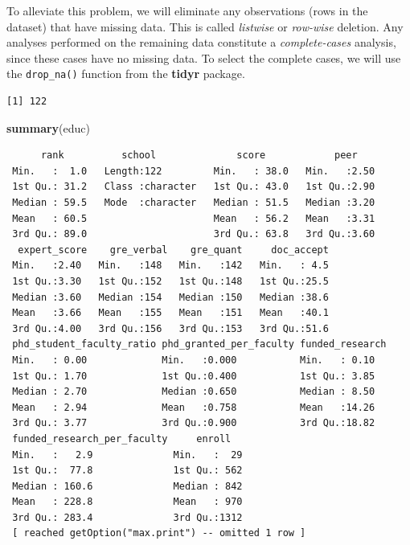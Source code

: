 \documentclass[]{book}
\newenvironment{Shaded}{\begin{snugshade}}{\end{snugshade}}
\newcommand{\CommentTok}[1]{\textcolor[rgb]{0.56,0.35,0.01}{\textit{#1}}}
\newcommand{\KeywordTok}[1]{\textcolor[rgb]{0.13,0.29,0.53}{\textbf{#1}}}
\newcommand{\NormalTok}[1]{#1}
\newcommand{\OperatorTok}[1]{\textcolor[rgb]{0.81,0.36,0.00}{\textbf{#1}}}
\newcommand{\StringTok}[1]{\textcolor[rgb]{0.31,0.60,0.02}{#1}}
\begin{document}
To alleviate this problem, we will eliminate any observations (rows in the dataset) that have missing data. This is called \emph{listwise} or \emph{row-wise} deletion. Any analyses performed on the remaining data constitute a \emph{complete-cases} analysis, since these cases have no missing data. To select the complete cases, we will use the \texttt{drop\_na()} function from the \textbf{tidyr} package.

\begin{Shaded}
\end{Shaded}

\begin{verbatim}
[1] 122
\end{verbatim}

\begin{Shaded}
\begin{Highlighting}[]
\KeywordTok{summary}\NormalTok{(educ)}
\end{Highlighting}
\end{Shaded}

\begin{verbatim}
      rank          school              score            peer     
 Min.   :  1.0   Length:122         Min.   : 38.0   Min.   :2.50  
 1st Qu.: 31.2   Class :character   1st Qu.: 43.0   1st Qu.:2.90  
 Median : 59.5   Mode  :character   Median : 51.5   Median :3.20  
 Mean   : 60.5                      Mean   : 56.2   Mean   :3.31  
 3rd Qu.: 89.0                      3rd Qu.: 63.8   3rd Qu.:3.60  
  expert_score    gre_verbal    gre_quant     doc_accept  
 Min.   :2.40   Min.   :148   Min.   :142   Min.   : 4.5  
 1st Qu.:3.30   1st Qu.:152   1st Qu.:148   1st Qu.:25.5  
 Median :3.60   Median :154   Median :150   Median :38.6  
 Mean   :3.66   Mean   :155   Mean   :151   Mean   :40.1  
 3rd Qu.:4.00   3rd Qu.:156   3rd Qu.:153   3rd Qu.:51.6  
 phd_student_faculty_ratio phd_granted_per_faculty funded_research
 Min.   : 0.00             Min.   :0.000           Min.   : 0.10  
 1st Qu.: 1.70             1st Qu.:0.400           1st Qu.: 3.85  
 Median : 2.70             Median :0.650           Median : 8.50  
 Mean   : 2.94             Mean   :0.758           Mean   :14.26  
 3rd Qu.: 3.77             3rd Qu.:0.900           3rd Qu.:18.82  
 funded_research_per_faculty     enroll    
 Min.   :   2.9              Min.   :  29  
 1st Qu.:  77.8              1st Qu.: 562  
 Median : 160.6              Median : 842  
 Mean   : 228.8              Mean   : 970  
 3rd Qu.: 283.4              3rd Qu.:1312  
 [ reached getOption("max.print") -- omitted 1 row ]
\end{verbatim}
\end{document}
